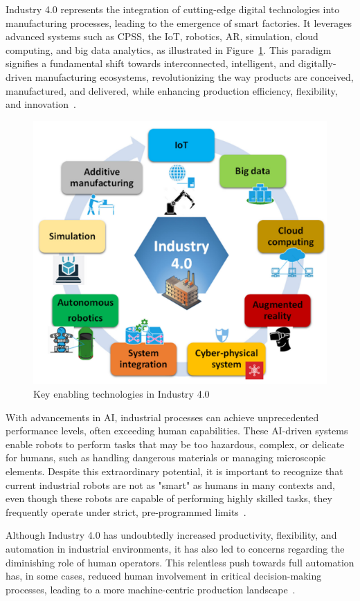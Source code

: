 Industry 4.0 represents the integration of cutting-edge digital technologies into manufacturing processes, leading to the emergence of smart factories. It leverages advanced systems such as \ac{CPSS}, the \ac{IoT}, robotics, \ac{AR}, simulation, cloud computing, and big data analytics, as illustrated in Figure~\ref{fig:key-tech-industry-4}. This paradigm signifies a fundamental shift towards interconnected, intelligent, and digitally-driven manufacturing ecosystems, revolutionizing the way products are conceived, manufactured, and delivered, while enhancing production efficiency, flexibility, and innovation~\cite{Moller2022, Ahmed2022}.

\begin{figure}[!htbp]
    \centering
    \includegraphics[width=0.7\linewidth]{figs/key-tech-industry-4.png}
    \caption{Key enabling technologies in Industry 4.0~\cite{Ahmed2022}}
    \label{fig:key-tech-industry-4}
\end{figure}
\FloatBarrier

With advancements in \ac{AI}, industrial processes can achieve unprecedented performance levels, often exceeding human capabilities. These \ac{AI}-driven systems enable robots to perform tasks that may be too hazardous, complex, or delicate for humans, such as handling dangerous materials or managing microscopic elements. Despite this extraordinary potential, it is important to recognize that current industrial robots are not as "smart" as humans in many contexts and, even though these robots are capable of performing highly skilled tasks, they frequently operate under strict, pre-programmed limits~\cite{Ahmed2022}.

Although Industry 4.0 has undoubtedly increased productivity, flexibility, and automation in industrial environments, it has also led to concerns regarding the diminishing role of human operators. This relentless push towards full automation has, in some cases, reduced human involvement in critical decision-making processes, leading to a more machine-centric production landscape~\cite{GOLOVIANKO2023102}.

